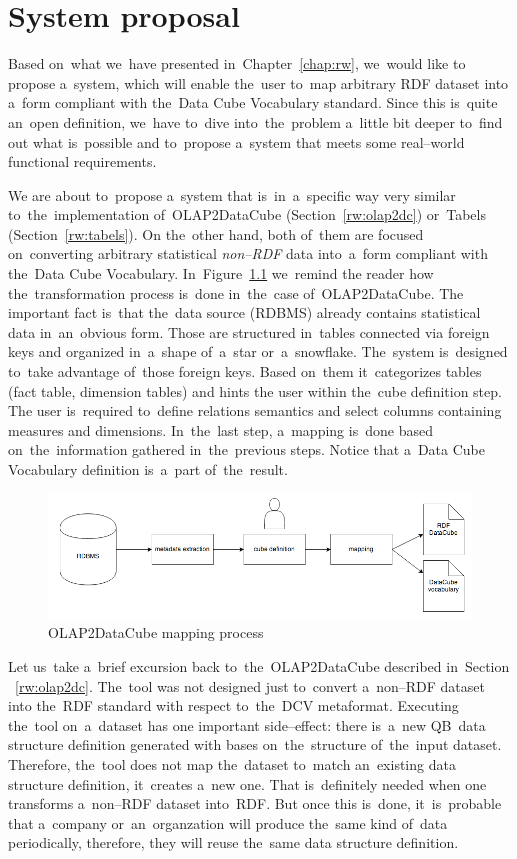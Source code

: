 \chapter{System proposal}
\label{ch:proposal}
Based on~what we~have presented in~Chapter~\ref{chap:rw}, we~would like to
propose a~system, which will enable the~user to~map arbitrary RDF dataset
into a~form compliant with the~Data Cube Vocabulary standard. Since this is~quite an~open definition, we~have to~dive into~the~problem a~little bit deeper to~find out what is~possible and to~propose a~system that meets some real--world 
functional requirements.

We are about to~propose a~system that is~in~a~specific way very similar to~the~implementation of~OLAP2DataCube (Section~\ref{rw:olap2dc}) or~Tabels (Section~\ref{rw:tabels}).
On the~other hand, both of~them are 
focused on~converting arbitrary statistical \emph{non--RDF} data into~a~form 
compliant with the~Data Cube Vocabulary. In~Figure~\ref{fig:olap2dc-mapping} we~remind
the reader how the~transformation process is~done in~the~case of~OLAP2DataCube.
The important fact is~that the~data source (RDBMS) already contains statistical data in~an~obvious form. 
Those are structured in~tables connected via foreign keys and organized in~a~shape of~a~star or~a~snowflake. The~system is~designed to~take advantage of~those 
foreign keys. Based on~them it~categorizes tables (fact table, dimension tables) and hints
the user within the~cube definition step.
The user is~required to~define relations semantics and select columns 
containing measures and dimensions. In~the~last step, a~mapping is~done based on~the~information gathered in~the~previous steps.
Notice that a~Data Cube Vocabulary definition is~a~part of~the~result.


\begin{figure}
	\centering
	\includegraphics[width=140mm]{img/mapping-olap2dc.png}
	\caption{OLAP2DataCube mapping process}
	\label{fig:olap2dc-mapping}
\end{figure}


Let us~take a~brief excursion back to~the~OLAP2DataCube described in~Section 
~\ref{rw:olap2dc}. The~tool was not designed just to~convert a~non--RDF dataset 
into the~RDF standard with respect to~the~DCV metaformat. Executing the~tool on~a~dataset has one important side--effect: there is~a~new QB~data structure definition
generated with bases on~the~structure of~the~input dataset. Therefore, the~tool does not map the~dataset to~match an~existing data structure definition, it~creates a~new one. That is~definitely
needed when one transforms a~non--RDF dataset into~RDF. But once 
this is~done, it~is~probable that a~company or~an~organzation will produce the~same kind of~data periodically, therefore, they will reuse the~same data structure definition.

